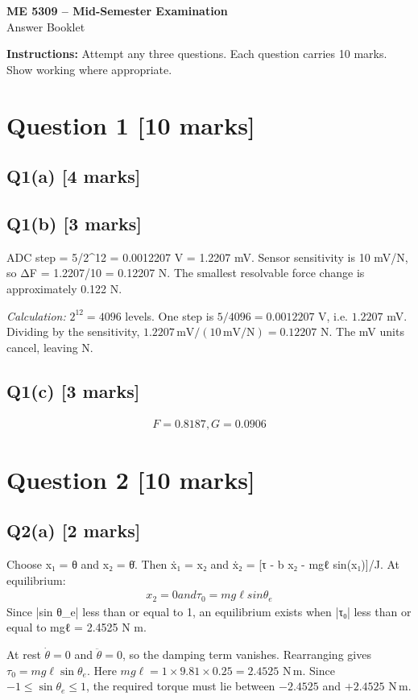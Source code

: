 \documentclass[11pt,a4paper]{article}
\begin{document}
\begin{center}
{\Large\bfseries ME 5309 -- Mid-Semester Examination}\\[3pt]
{\large Answer Booklet}\\[8pt]
\end{center}
\textbf{Instructions:} Attempt any three questions. Each question carries 10 marks. Show working where appropriate.
\section*{Question 1 \hfill [10 marks]}
\subsection*{Q1(a) \hfill [4 marks]}

\vspace{2mm}

\subsection*{Q1(b) \hfill [3 marks]}

ADC step = 5/2\textasciicircum{}12 = 0.0012207 V = 1.2207 mV.
Sensor sensitivity is 10 mV/N, so ΔF = 1.2207/10 = 0.12207 N.
The smallest resolvable force change is approximately 0.122 N.\par\smallskip\textit{Calculation:} $2^{12}=4096$ levels. One step is $5/4096=0.0012207$ V, i.e. $1.2207$ mV. Dividing by the sensitivity, $1.2207\,\mathrm{mV}/(10\,\mathrm{mV/N})=0.12207$ N. The mV units cancel, leaving N.

\subsection*{Q1(c) \hfill [3 marks]}

\[\begin{aligned}F = 0.8187, G = 0.0906\end{aligned}\]

\section*{Question 2 \hfill [10 marks]}
\subsection*{Q2(a) \hfill [2 marks]}

Choose x₁ = θ and x₂ = θ̇.
Then ẋ₁ = x₂ and ẋ₂ = [τ - b x₂ - mgℓ sin(x₁)]/J.
At equilibrium:\[\begin{aligned}x_2 = 0 and τ_0 = mg\ell sin \theta_e\end{aligned}\]
Since |sin θ\_e| less than or equal to 1, an equilibrium exists when |τ₀| less than or equal to mgℓ = 2.4525 N m.\par\smallskip At rest $\dot\theta=0$ and $\ddot\theta=0$, so the damping term vanishes. Rearranging gives $\tau_0=mg\ell\sin\theta_e$. Here $mg\ell=1\times9.81\times0.25=2.4525$ N\,m. Since $-1\leq\sin\theta_e\leq1$, the required torque must lie between $-2.4525$ and $+2.4525$ N\,m.
\end{document}
